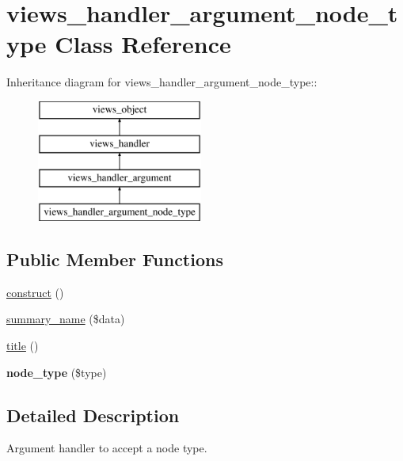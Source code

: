 \hypertarget{classviews__handler__argument__node__type}{
\section{views\_\-handler\_\-argument\_\-node\_\-type Class Reference}
\label{classviews__handler__argument__node__type}
}
Inheritance diagram for views\_\-handler\_\-argument\_\-node\_\-type::\begin{figure}[H]
\begin{center}
\leavevmode
\includegraphics[height=4cm]{classviews__handler__argument__node__type}
\end{center}
\end{figure}
\subsection*{Public Member Functions}
\begin{CompactItemize}
\item 
\hyperlink{classviews__handler__argument__node__type_46ce861fa61b59bb22f001501c3b2650}{construct} ()
\item 
\hyperlink{classviews__handler__argument__node__type_e4200f641b598c219f733f10386f7d90}{summary\_\-name} (\$data)
\item 
\hyperlink{classviews__handler__argument__node__type_c17f7b9733895da68b132e6b97dcc917}{title} ()
\item 
\hypertarget{classviews__handler__argument__node__type_b556e038442ee50ebf55e43a793796ec}{
\textbf{node\_\-type} (\$type)}
\label{classviews__handler__argument__node__type_b556e038442ee50ebf55e43a793796ec}

\end{CompactItemize}


\subsection{Detailed Description}
Argument handler to accept a node type. 

